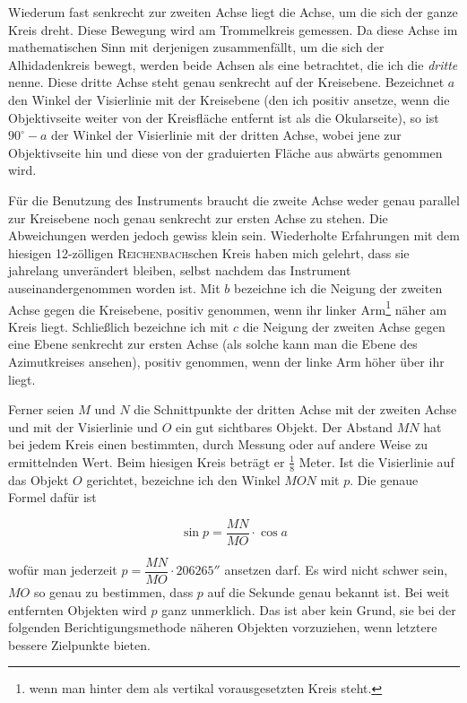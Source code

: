 \par\indent Wiederum fast senkrecht zur zweiten Achse liegt die Achse, um die sich der ganze Kreis dreht. Diese Bewegung wird am Trommelkreis gemessen. Da diese Achse im mathematischen Sinn mit derjenigen zusammenfällt,  um die sich der Alhidadenkreis bewegt, werden beide Achsen als eine betrachtet, die ich die \emph{dritte} nenne. Diese dritte Achse steht genau senkrecht auf der Kreisebene. Bezeichnet $a$ den Winkel der Visierlinie mit der Kreisebene (den ich positiv ansetze, wenn die Objektivseite weiter von der Kreisfläche entfernt ist als die Okularseite), so ist $90^\circ{-}a$ der Winkel der Visierlinie mit der dritten Achse, wobei jene zur Objektivseite hin und diese von der graduierten Fläche aus abwärts genommen wird.

\par\indent Für die Benutzung des Instruments braucht die zweite Achse weder genau parallel zur Kreisebene noch genau senkrecht zur ersten Achse zu stehen. Die Abweichungen werden jedoch gewiss klein sein. Wiederholte Erfahrungen mit dem hiesigen 12-zölligen \textsc{Reichenbach}schen Kreis haben mich gelehrt, dass sie jahrelang unverändert bleiben, selbst nachdem das Instrument auseinandergenommen worden ist. Mit $b$ bezeichne ich die Neigung der zweiten Achse gegen die Kreisebene, positiv genommen, wenn ihr linker Arm\footnote{wenn man hinter dem als vertikal vorausgesetzten Kreis steht.} näher am Kreis liegt. Schließlich bezeichne ich mit $c$ die Neigung der zweiten Achse gegen eine Ebene senkrecht zur ersten Achse (als solche kann man die Ebene des Azimutkreises ansehen), positiv genommen, wenn der linke Arm höher über ihr liegt.

\par\indent Ferner seien $M$ und $N$ die Schnittpunkte der dritten Achse mit der zweiten Achse und mit der Visierlinie und $O$ ein gut sichtbares Objekt. Der Abstand $MN$ hat bei jedem Kreis einen bestimmten, durch Messung oder auf andere Weise zu ermittelnden Wert. Beim hiesigen Kreis beträgt er $\frac{1}{8}$ Meter. Ist die Visierlinie auf das Objekt $O$ gerichtet, bezeichne ich den Winkel $MON$ mit $p$. Die genaue Formel dafür ist

\[ \sin p = \frac{MN}{MO}\cdot\cos a \]

\noindent wofür man jederzeit $p = \dfrac{MN}{MO}\cdot 206265''$ ansetzen darf. Es wird nicht schwer sein, $MO$ so genau zu bestimmen, dass $p$ auf die Sekunde genau bekannt ist. Bei weit entfernten Objekten wird $p$ ganz unmerklich. Das ist aber kein Grund, sie bei der folgenden Berichtigungsmethode näheren Objekten vorzuziehen, wenn letztere bessere Zielpunkte bieten.

